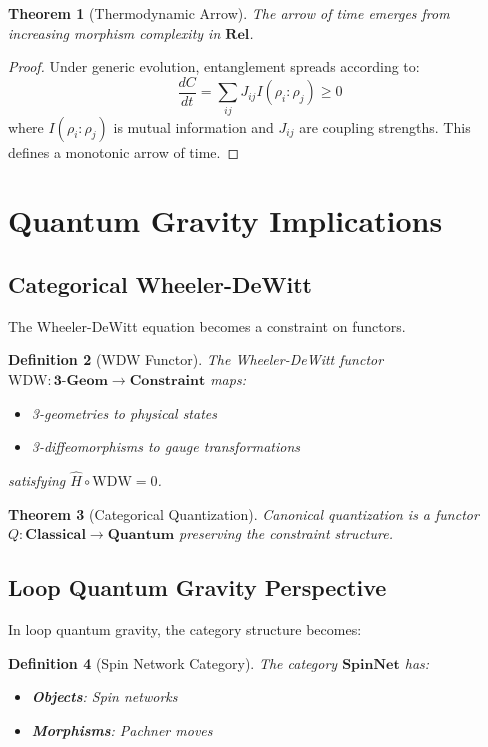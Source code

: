 \documentclass[12pt,a4paper]{article}
\newtheorem{theorem}{Theorem}[section]
\newtheorem{definition}[theorem]{Definition}
\begin{document}
\begin{theorem}[Thermodynamic Arrow]
The arrow of time emerges from increasing morphism complexity in $\mathbf{Rel}$.
\end{theorem}

\begin{proof}
Under generic evolution, entanglement spreads according to:
\[
\frac{dC}{dt} = \sum_{ij} J_{ij} I(\rho_i : \rho_j) \geq 0
\]
where $I(\rho_i : \rho_j)$ is mutual information and $J_{ij}$ are coupling strengths. This defines a monotonic arrow of time.
\end{proof}

\section{Quantum Gravity Implications}

\subsection{Categorical Wheeler-DeWitt}

The Wheeler-DeWitt equation becomes a constraint on functors.

\begin{definition}[WDW Functor]
The Wheeler-DeWitt functor $\text{WDW}: \mathbf{3\text{-}Geom} \to \mathbf{Constraint}$ maps:
\begin{itemize}
\item 3-geometries to physical states
\item 3-diffeomorphisms to gauge transformations
\end{itemize}
satisfying $\hat{H} \circ \text{WDW} = 0$.
\end{definition}

\begin{theorem}[Categorical Quantization]
Canonical quantization is a functor $Q: \mathbf{Classical} \to \mathbf{Quantum}$ preserving the constraint structure.
\end{theorem}

\subsection{Loop Quantum Gravity Perspective}

In loop quantum gravity, the category structure becomes:

\begin{definition}[Spin Network Category]
The category $\mathbf{SpinNet}$ has:
\begin{itemize}
\item \textbf{Objects}: Spin networks
\item \textbf{Morphisms}: Pachner moves
\end{itemize}
\end{definition}
\end{document}
